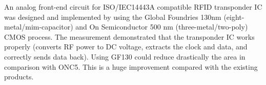 An analog front-end circuit for ISO/IEC14443A compatible RFID transponder IC was designed and implemented by using the Global Foundries 130nm (eight-metal/mim-capacitor) and On Semiconductor 500 nm (three-metal/two-poly) CMOS process. The measurement demonstrated that the transponder IC works properly (converts RF power to DC voltage, extracts the clock and data, and correctly sends data back). Using GF130 could reduce drastically the area in comparison with ONC5. This is a huge improvement compared with the existing products.